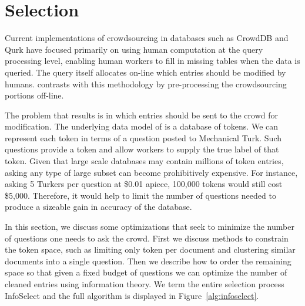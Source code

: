 \section{Selection}

Current implementations of crowdsourcing in databases such as CrowdDB \cite{DBLP:conf/sigmod/FranklinKKRX11} and Qurk \cite{DBLP:conf/sigmod/MarcusWKMM11} have focused primarily on using human computation at the query processing level, enabling human workers to fill in missing tables when the data is queried.  The query itself allocates on-line which entries should be modified by humans.  \sysName contrasts with this methodology by pre-processing the crowdsourcing portions off-line.

The problem that results is in which entries should be sent to the crowd for modification.  The underlying data model of \sysName is a database of tokens.  We can represent each token in terms of a question posted to Mechanical Turk.  Such questions provide a token and allow workers to supply the true label of that token.  Given that large scale databases may contain millions of token entries, asking any type of large subset can become prohibitively expensive.  For instance, asking 5 Turkers per question at \$0.01 apiece, 100,000 tokens would still cost \$5,000. Therefore, it would help to limit the number of questions needed to produce a sizeable gain in accuracy of the database.

In this section, we discuss some optimizations that seek to minimize the number of questions one needs to ask the crowd.  First we discuss methods to constrain the token space, such as limiting only token per document and clustering similar documents into a single question.  Then we describe how to order the remaining space so that given a fixed budget of questions we can optimize the number of cleaned entries using information theory.  We term the entire selection process InfoSelect and the full algorithm is displayed in Figure~\ref{alg:infoselect}. 

